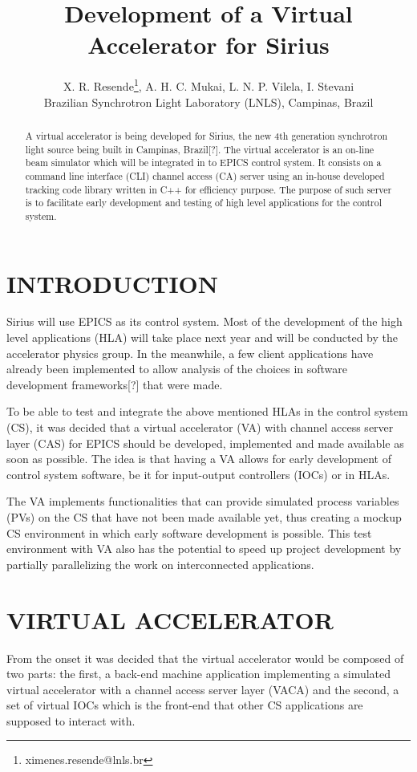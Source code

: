 \documentclass[a4paper,
              ]{jacow}
\begin{document}
\title{Development of a Virtual Accelerator for Sirius}
\author{X. R. Resende\thanks{ximenes.resende@lnls.br}, A. H. C. Mukai, L. N. P. Vilela, I. Stevani \\ Brazilian Synchrotron Light Laboratory (LNLS), Campinas, Brazil}
\maketitle

\begin{abstract}
A virtual accelerator is being developed for Sirius, the new 4th generation synchrotron light source being built
in Campinas, Brazil[?]. The virtual accelerator is an on-line beam simulator which will be integrated in to EPICS control system.
It consists on a command line interface (CLI) channel access (CA) server using an in-house developed tracking code library written
in C++ for efficiency purpose. The purpose of such server is to facilitate early development and testing of high level applications
for the control system.
\end{abstract}

\section{INTRODUCTION}
Sirius will use EPICS as its control system. Most of the development of the high level applications (HLA) will take place
next year and will be conducted by the accelerator physics group. In the meanwhile, a few client applications have already been
implemented to allow analysis of the choices in software development frameworks[?] that were made.

To be able to test and integrate the above mentioned HLAs in the control system (CS), it was decided that a virtual accelerator
(VA) with channel access server layer (CAS) for EPICS should be developed, implemented and made available as soon as possible.
The idea is that having a VA allows for early development of control system software, be it for input-output controllers (IOCs) or
in HLAs.

The VA implements functionalities that can provide simulated process variables (PVs) on the CS that have not been made available
yet, thus creating a mockup CS environment in which early software development is possible.
This test environment with VA also has the potential to speed up project development by partially parallelizing the work on
interconnected applications.


\section{VIRTUAL ACCELERATOR}
From the onset it was decided that the virtual accelerator would be composed of two parts: the first, a back-end machine
application implementing a simulated virtual accelerator with a channel access server layer (VACA) and the second, a set of
virtual IOCs which is the front-end that other CS applications are supposed to interact with.
\end{document}
